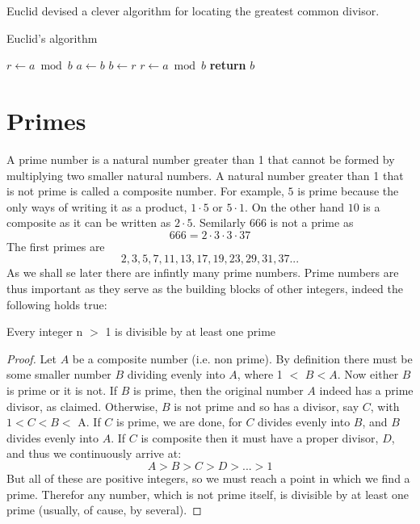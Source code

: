 Euclid devised a clever algorithm for locating the greatest common divisor.
\begin{algorithm}
    \caption{Euclid’s algorithm}
    \label{euclid}
    \begin{algorithmic}[1] %
         
            \State $r\gets a \bmod b$
             
                \State $a \gets b$
                \State $b \gets r$
                \State $r \gets a \bmod b$
            \EndWhile\label{euclidendwhile}
            \State \textbf{return} $b$
        \EndProcedure
    \end{algorithmic}
\end{algorithm}

\section{Primes}
A prime number is a natural number greater than 1 that cannot be formed by multiplying two smaller natural numbers. A natural number greater than 1 that is not prime is called a composite number. For example, $5$ is prime because the only ways of writing it as a product, $1 \cdot 5$ or $5 \cdot 1$. On the other hand $10$ is a composite as it can be written as $2 \cdot 5$. Semilarly 666 is not a prime as 
\[
666 = 2 \cdot 3 \cdot 3 \cdot 37
\]
 The first primes are
\[
2, 3, 5, 7, 11, 13, 17, 19, 23, 29, 31, 37 ...
\]
As we shall se later there are infintly many prime numbers. Prime numbers are thus important as they serve as the building blocks of other integers, indeed the following holds true:

\begin{proposition}\label{prim_div}
Every integer n $>$ 1 is divisible by at least one prime
\end{proposition}
\begin{proof}
Let $A$ be a composite number (i.e. non prime). By definition there must be some smaller number $B$ dividing evenly into $A$, where 1 $<$ $B < A$. Now either $B$ is prime or it is not. If $B$ is prime, then the original number $A$ indeed has a prime divisor, as claimed. Otherwise, $B$ is not prime and so has a divisor, say $C$, with $1 < C < B <$ A. If $C$ is prime, we are done, for $C$ divides evenly into $B$, and $B$ divides evenly into $A$. If $C$ is composite then it must have a proper divisor, $D$, and thus we continuously arrive at:
\[
A > B > C > D > ... > 1
\]
But all of these are positive integers, so we must reach a point in which we find a prime. Therefor any number, which is not prime itself, is divisible by at least one prime (usually, of cause, by several).
\end{proof}

